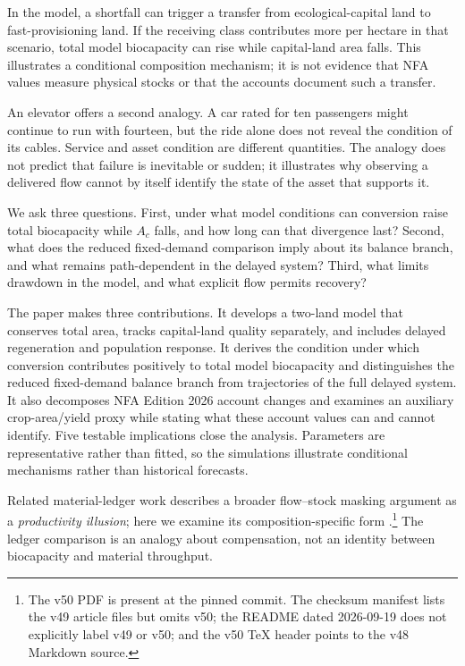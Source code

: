 \documentclass[preprint,12pt,authoryear]{elsarticle}
\begin{document}
\begin{samepage}
In the model, a shortfall can trigger a transfer from ecological-capital land to fast-provisioning land. If the receiving class contributes more per hectare in that scenario, total model biocapacity can rise while capital-land area falls. This illustrates a conditional composition mechanism; it is not evidence that NFA values measure physical stocks or that the accounts document such a transfer.\par
\end{samepage}

An elevator offers a second analogy. A car rated for ten passengers might continue to run with fourteen, but the ride alone does not reveal the condition of its cables. Service and asset condition are different quantities. The analogy does not predict that failure is inevitable or sudden; it illustrates why observing a delivered flow cannot by itself identify the state of the asset that supports it.

We ask three questions. First, under what model conditions can conversion raise total biocapacity while $A_c$ falls, and how long can that divergence last? Second, what does the reduced fixed-demand comparison imply about its balance branch, and what remains path-dependent in the delayed system? Third, what limits drawdown in the model, and what explicit flow permits recovery?

The paper makes three contributions. It develops a two-land model that conserves total area, tracks capital-land quality separately, and includes delayed regeneration and population response. It derives the condition under which conversion contributes positively to total model biocapacity and distinguishes the reduced fixed-demand balance branch from trajectories of the full delayed system. It also decomposes NFA Edition 2026 account changes and examines an auxiliary crop-area/yield proxy while stating what these account values can and cannot identify. Five testable implications close the analysis. Parameters are representative rather than fitted, so the simulations illustrate conditional mechanisms rather than historical forecasts.

Related material-ledger work describes a broader flow--stock masking argument as a \emph{productivity illusion}; here we examine its composition-specific form \citep{Abaee2026c}.\footnote{The v50 PDF is present at the pinned commit. The checksum manifest lists the v49 article files but omits v50; the README dated 2026-09-19 does not explicitly label v49 or v50; and the v50 TeX header points to the v48 Markdown source.} The ledger comparison is an analogy about compensation, not an identity between biocapacity and material throughput.
\end{document}
